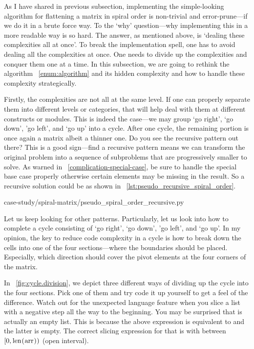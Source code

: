 As I have shared in previous subsection, implementing the simple-looking algorithm for flattening
a matrix in spiral order is non-trivial and error-prune---if we do it in a brute force way.
To the `why' question---why implementing this in a more readable way is so
hard.
The answer, as mentioned above, is `dealing these complexities all at once'.
To break the implementation spell, one has to avoid dealing all the complexities at once.
One needs to divide up the complexities and conquer them one at a time.
In this subsection, we are going to rethink the algorithm ~\autoref{enum:algorithm} and its
hidden complexity and how to handle these complexity strategically.

Firstly, the complexities are not all at the same level.
If one can properly separate them into different levels or categories, that will help deal with them
at different constructs or modules.
This is indeed the case---we may group `go right', `go down', 'go left', and `go up' into a cycle.
After one cycle, the remaining portion is once again a matrix albeit a thinner one.
Do you see the recursive pattern out there?
This is a good sign---find a recursive pattern means we can transform the original
problem into a sequence of subproblems that are progressively smaller to solve.
As warned in ~\autoref{complication-special-case}, be sure to handle the special base case properly
otherwise certain elements may be missing in the result.
So a recursive solution could be as shown in ~\autoref{lst:pseudo_recursive_spiral_order}.

\begin{clisting}
    
    {case-study/spiral-matrix/pseudo_spiral_order_recursive.py}
\end{clisting}
\newpage
Let us keep looking for other patterns.
Particularly, let us look into how to complete a cycle consisting of `go
right', `go down', 'go left', and `go up'.
In my opinion, the key to reduce code complexity in a cycle is how to break down the cells
into one of the four sections---where the boundaries should be placed.
Especially, which direction should cover the pivot elements at the four corners of the matrix.

In ~\autoref{fig:cycle.division}, we depict three different ways of dividing up the cycle into
the four sections.
Pick one of them and try code it up yourself to get a feel of the difference.
Watch out for the unexpected \python language feature when you slice a list
with a negative step all the way to the beginning.
You may be surprised that  is actually an empty list.
This is because the above expression is equivalent to 
and the latter is empty.
The correct slicing expression for that is  with  between $\left[0,
\mbox{\code{len(arr)}}\right)$ (open interval).

